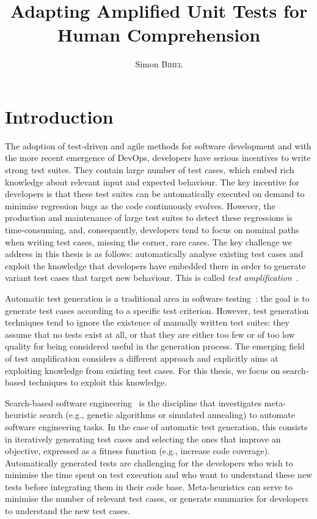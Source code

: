 \documentclass[a4paper,11pt]{sdm_internship}
\title{Adapting Amplified Unit Tests for Human Comprehension}
\author{Simon \textsc{Bihel}}
\theoremstyle{definition}
\begin{document}
\maketitle

\section*{Introduction}%
\label{sec:intro}%
The adoption of test-driven and agile methods for software development and with the more recent emergence of DevOps, developers have serious incentives to write strong test suites.
They contain large number of test cases, which embed rich knowledge about relevant input and expected behaviour.
The key incentive for developers is that these test suites can be automatically executed on demand to minimise regression bugs as the code continuously evolves.
However, the production and maintenance of large test suites to detect these regressions is time-consuming, and, consequently, developers tend to focus on nominal paths when writing test cases, missing the corner, rare cases.
The key challenge we address in this thesis is as follows: automatically analyse existing test cases and exploit the knowledge that developers have embedded there in order to generate variant test cases that target new behaviour.
This is called \emph{test amplification}~\cite{danglot2017emerging}.

Automatic test generation is a traditional area in software testing~\cite{mcminn2011search}: the goal is to generate test cases according to a specific test criterion.
However, test generation techniques tend to ignore the existence of manually written test suites: they assume that no tests exist at all, or that they are either too few or of too low quality for being considered useful in the generation process.
The emerging field of test amplification considers a different approach and explicitly aims at exploiting knowledge from existing test cases.
For this thesis, we focus on search-based techniques to exploit this knowledge.

Search-based software engineering~\cite{harman2001search} is the discipline that investigates meta-heuristic search (e.g., genetic algorithms or simulated annealing) to automate software engineering tasks.
In the case of automatic test generation, this consists in iteratively generating test cases and selecting the ones that improve an objective, expressed as a fitness function (e.g., increase code coverage).
Automatically generated tests are challenging for the developers who wish to minimise the time spent on test execution and who want to understand these new tests before integrating them in their code base.
Meta-heuristics can serve to minimise the number of relevant test cases, or generate summaries for developers to understand the new test cases.
\end{document}
